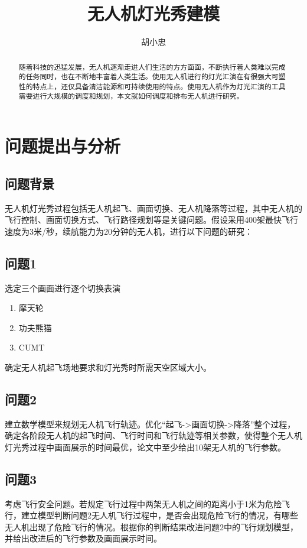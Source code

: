 \documentclass[UTF8,12pt]{ctexart}
\title{\bfseries{无人机灯光秀建模}}
\author{胡小忠}
\date{}
\begin{document}
\maketitle

\begin{abstract}
    随着科技的迅猛发展，无人机逐渐走进人们生活的方方面面，不断执行着人类难以完成的任务同时，也在不断地丰富着人类生活。使用无人机进行的灯光汇演在有很强大可塑性的特点上，还仅具备清洁能源和可持续使用的特点。使用无人机作为灯光汇演的工具需要进行大规模的调度和规划，本文就如何调度和排布无人机进行研究。\cite{基于一致性的无人机编队飞行几何构型控制}
\end{abstract}
\thispagestyle{empty}
\newpage
\tableofcontents
\setcounter{page}{1}
\newpage
\section{问题提出与分析}
\subsection{问题背景}
无人机灯光秀过程包括无人机起飞、画面切换、无人机降落等过程，其中无人机的飞行控制、画面切换方式、飞行路径规划等是关键问题。假设采用400架最快飞行速度为3米/秒，续航能力为20分钟的无人机，进行以下问题的研究：
\subsection{问题1}
选定三个画面进行逐个切换表演
\begin{enumerate}
    \item 摩天轮
    \item 功夫熊猫
    \item CUMT
\end{enumerate}
确定无人机起飞场地要求和灯光秀时所需天空区域大小。
\subsection{问题2}
建立数学模型来规划无人机飞行轨迹。优化“起飞->画面切换->降落”整个过程，确定各阶段无人机的起飞时间、飞行时间和飞行轨迹等相关参数，使得整个无人机灯光秀过程中画面展示的时间最优，论文中至少给出10架无人机的飞行参数。
\subsection{问题3}
考虑飞行安全问题。若规定飞行过程中两架无人机之间的距离小于1米为危险飞行，建立模型判断问题2无人机飞行过程中，是否会出现危险飞行的情况，有哪些无人机出现了危险飞行的情况。根据你的判断结果改进问题2中的飞行规划模型，并给出改进后的飞行参数及画面展示时间。
\end{document}
